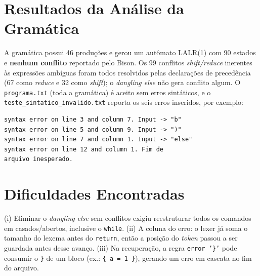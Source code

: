\documentclass[sigconf,nonacm]{acmart}
\begin{document}
\section{Resultados da Análise da Gramática}
A gramática possui 46 produções e gerou um autômato LALR(1) com 90 estados e
\textbf{nenhum conflito} reportado pelo Bison. Os 99 conflitos \emph{shift/reduce}
inerentes às expressões ambíguas foram todos resolvidos pelas declarações de
precedência (67 como \emph{reduce} e 32 como \emph{shift}); o \emph{dangling else} não
gera conflito algum. O \texttt{programa.txt} (toda a gramática) é aceito sem erros
sintáticos, e o \texttt{teste\_sintatico\_invalido.txt} reporta os seis erros
inseridos, por exemplo:

\begin{small}
\begin{verbatim}
syntax error on line 3 and column 7. Input -> "b"
syntax error on line 5 and column 9. Input -> ")"
syntax error on line 7 and column 1. Input -> "else"
syntax error on line 12 and column 1. Fim de
arquivo inesperado.
\end{verbatim}
\end{small}

\section{Dificuldades Encontradas}
(i) Eliminar o \emph{dangling else} sem conflitos exigiu reestruturar todos os comandos
em casados/abertos, inclusive o \texttt{while}. (ii) A coluna do erro: o lexer já soma
o tamanho do lexema antes do \texttt{return}, então a posição do \emph{token} passou a
ser guardada antes desse avanço. (iii) Na recuperação, a regra \texttt{error '\}'} pode
consumir o \texttt{\}} de um bloco (ex.: \texttt{\{ a = 1 \}}), gerando um erro em
cascata no fim do arquivo.

\appendix
\end{document}
